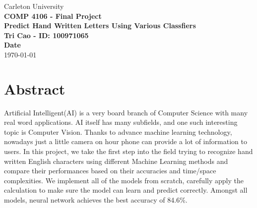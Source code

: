 \documentclass[12,]{article}
\title{}
\author{}
\date{}
\begin{document}
\onehalfspacing
{}

\newpage

\begin{titlepage}

\begin{center}
\normalsize{Carleton University}\\
\vspace*{13\baselineskip}
\Huge{\textbf{COMP 4106 - Final Project}}\\
\Large{\textbf{Predict Hand Written Letters Using Various Classfiers}}\\
\vspace*{8\baselineskip}
\Large{\textbf{ Tri Cao - ID: 100971065}}\\
\vspace*{2\baselineskip}
\Large{\textbf{Date}}\\
\today
\end{center}
\end{titlepage}

\doublespacing

\hypersetup{linkcolor = black}
\newpage


\tableofcontents
{}

\newpage
\doublespacing

\newpage
{}
\hypersetup{linkcolor = blue}


\hypertarget{abstract}{%
\section{Abstract}\label{abstract}}

Artificial Intelligent(AI) is a very board branch of Computer Science
with many real word applications. AI itself has many subfields, and one
such interesting topic is Computer Vision. Thanks to advance machine
learning technology, nowadays just a little camera on hour phone can
provide a lot of information to users. In this project, we take the
first step into the field trying to recognize hand written English
characters using different Machine Learning methods and compare their
performances based on their accuracies and time/space complexities. We
implement all of the models from scratch, carefully apply the
calculation to make sure the model can learn and predict correctly.
Amongst all models, neural network achieves the best accuracy of 84.6\%.
\end{document}
